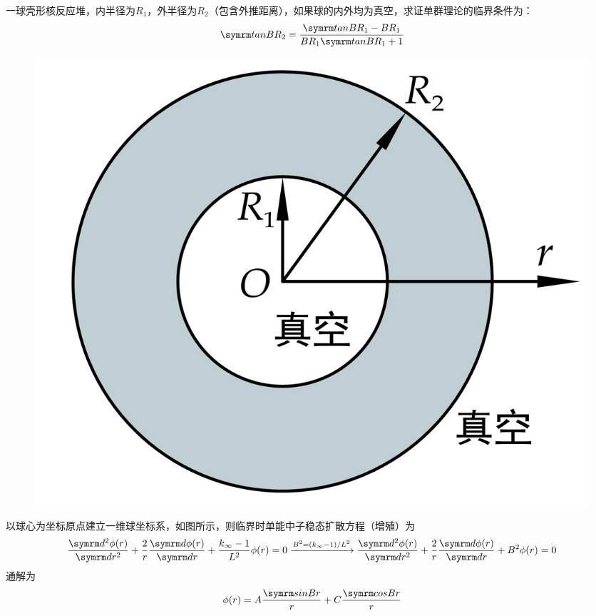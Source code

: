 \begin{exercise}
    一球壳形核反应堆，内半径为$R_1$，外半径为$R_2$（包含外推距离），如果球的内外均为真空，求证单群理论的临界条件为：
    \begin{equation*}
        \ntan BR_2 = \frac{\ntan BR_1 - BR_1}{BR_1\ntan BR_1 + 1}
    \end{equation*}
    \begin{solution}
        \begin{figure}[H]
            \centering
            \includegraphics[scale=1]{figures/fig4.8.png}
        \end{figure}
        以球心为坐标原点建立一维球坐标系，如图所示，则临界时单能中子稳态扩散方程（增殖）为
        \begin{equation*}
            \ddv{\phi(r)}{r} + \frac{2}{r} \dv{\phi(r)}{r} + \frac{k_{\infty} - 1}{L^2}\phi(r) = 0 \xrightarrow{B^2 = (k_{\infty} - 1)/L^2} \ddv{\phi(r)}{r} + \frac{2}{r} \dv{\phi(r)}{r} + B^2 \phi(r) = 0
        \end{equation*}
        通解为
        \begin{equation*}
            \phi(r) = A\frac{\nsin Br}{r} + C\frac{\ncos Br}{r}
        \end{equation*}
        

\end{solution}
\end{exercise}
